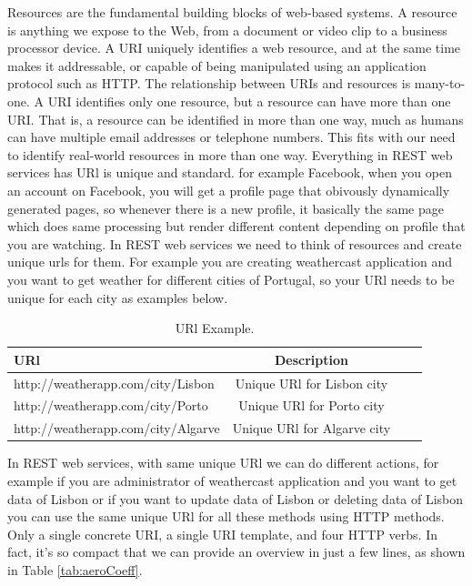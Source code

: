 Resources are the fundamental building blocks of web-based systems. A resource is anything we expose to the Web,
from a document or video clip to a business processor device. A URI uniquely identifies a web resource, and at the
same time makes it addressable, or capable of being manipulated using an application protocol such as HTTP. The
relationship between URIs and resources is many-to-one\citep{thesis:state5}. A URI identifies only one resource, but a resource can
have more than one URI. That is, a resource can be identified in more than one way, much as humans can have multiple
email addresses or telephone numbers. This fits with our  need to identify real-world resources in more
than one way. Everything in REST web services has URl is unique and standard. for example Facebook, when you open an
account on Facebook, you will get a profile page that obivously dynamically generated pages, so whenever there is a
new profile, it basically the same page which does same processing but render different content depending on profile
that you are watching. In REST web services we need to think of resources and create unique urls for them. For example you are creating weathercast application and you want
to get weather for different cities of Portugal, so your URl needs to be unique for each city as examples below.\\

\begin{table}[!htb]
  \renewcommand{\arraystretch}{1.2} %
  \centering
  \begin{tabular}{lccc}
    \toprule
    URl & Description  \\
    \midrule
    http://weatherapp.com/city/Lisbon &  Unique URl for Lisbon city\\
    http://weatherapp.com/city/Porto & Unique URl for Porto city\\
    http://weatherapp.com/city/Algarve & Unique URl for Algarve city\\
    \bottomrule
  \end{tabular}
  \caption[URl Example.]{URl Example.}
  \label{tab:urlexample}
\end{table}

In REST web services, with same unique URl we can do different actions, for example if you are administrator of weathercast
application and you want to get data of Lisbon or if you want to update data of Lisbon or deleting data of Lisbon you can
use the same unique URl for all these methods using HTTP methods. Only a single concrete URI, a single URI template,
and four HTTP verbs. In fact, it’s so compact that we can provide an overview in just a few lines, as shown in Table \ref{tab:aeroCoeff}.

